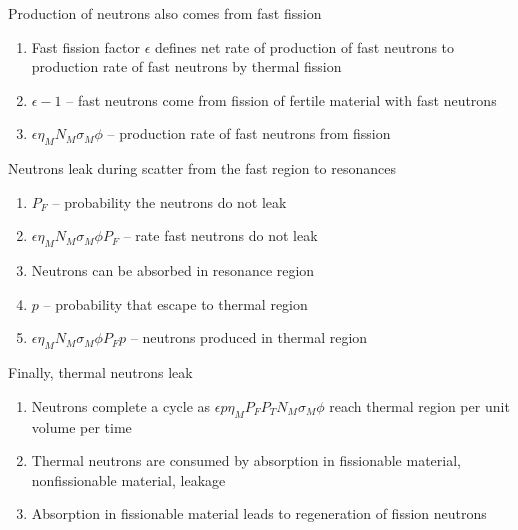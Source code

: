 \documentclass[aspectratio=1610,pdftex,dvipsnames,compress,xcolor={dvipsnames}]{beamer}
\begin{document}
\begin{frame}{Production of neutrons also comes from fast fission}
    \begin{enumerate}[series=outerlist,topsep=0pt,itemsep=21pt,leftmargin=*,label=(\arabic*)]
        \item[]Fast fission factor $\epsilon$ defines net rate of production of fast neutrons to production rate of fast neutrons by thermal fission
        \item[]$\epsilon - 1$ -- fast neutrons come from fission of fertile material with fast neutrons
        \item[]$\epsilon\eta_M N_M \sigma_M \phi$ -- production rate of fast neutrons from fission
    \end{enumerate}
\end{frame}


\begin{frame}{Neutrons leak during scatter from the fast region to resonances}
    \begin{enumerate}[series=outerlist,topsep=0pt,itemsep=21pt,leftmargin=*,label=(\arabic*)]
        \item[]$P_F$ -- probability the neutrons do not leak
        \item[]$\epsilon\eta_M N_M\sigma_M\phi P_F$ -- rate fast neutrons do not leak
        \item[]Neutrons can be absorbed in resonance region
        \item[]$p$ -- probability that escape to thermal region
        \item[]$\epsilon\eta_M N_M\sigma_M\phi P_F p$ -- neutrons produced in thermal region
    \end{enumerate}
\end{frame}


\begin{frame}{Finally, thermal neutrons leak}
    \begin{enumerate}[series=outerlist,topsep=0pt,itemsep=21pt,leftmargin=*,label=(\arabic*)]
        \item[]Neutrons complete a cycle as $\epsilon p \eta_M P_F P_T N_M \sigma_M \phi$ reach thermal region per unit volume per time
        \item[]Thermal neutrons are consumed by absorption in fissionable material, nonfissionable material, leakage
        \item[]Absorption in fissionable material leads to regeneration of fission neutrons
    \end{enumerate}
\end{frame}
\end{document}
